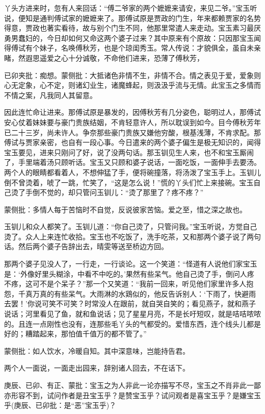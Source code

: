 \begin{parag}


    丫头方进来时，忽有人来回话：“傅二爷家的两个嬷嬷来请安，来见二爷。”宝玉听说，便知是通判傅试家的嬷嬷来了。那傅试原是贾政的门生，年来都赖贾家的名势得意，贾政也著实看待，故与别个门生不同，他那里常遣人来走动。宝玉素习最厌勇男蠢妇的，今日却如何又命这两个婆子过来？其中原来有个原故：只因那宝玉闻得傅试有个妹子，名唤傅秋芳，也是个琼闺秀玉。常人传说：才貌俱全，虽自未亲睹，然遐思遥爱之心十分诚敬，不命他们进来，恐薄了傅秋芳，\begin{note}已卯夹批：痴想。蒙侧批：大抵诸色非情不生，非情不合。情之表见于爱，爱象则心无定象，心不定，则诸幻业生，诸魔蜂起，则汲汲乎流与无情。此宝玉之多情而不情之案，凡我同人其留意。\end{note}因此连忙命让进来。那傅试原是暴发的，因傅秋芳有几分姿色，聪明过人，那傅试安心仗着妹妹要与豪门贵族结姻，不肯轻意许人，所以耽误到如今。目今傅秋芳年已二十三岁，尚未许人。争奈那些豪门贵族又嫌他穷酸，根基浅薄，不肯求配。那傅试与贾家亲密，也自有一段心事。今日遣来的两个婆子偏生是极无知识的，闻得宝玉要见，进来只刚问了好，说了没两句话。那玉钏见生人来，也不和宝玉厮闹了，手里端着汤只顾听话。宝玉又只顾和婆子说话，一面吃饭，一面伸手去要汤。两个人的眼睛都看着人，不想伸猛了手，便将碗撞落，将汤泼了宝玉手上。玉钏儿倒不曾烫着，唬了一跳，忙笑了，“这是怎么说！”慌的丫头们忙上来接碗。宝玉自己烫了手倒不觉的，却只管问玉钏儿：“烫了那里了？疼不疼？”\begin{note}蒙侧批：多情人每于苦恼时不自觉，反说彼家苦恼。爱之至，惜之深之故也。\end{note}玉钏儿和众人都笑了。玉钏儿道：“你自己烫了，只管问我。”宝玉听说，方觉自己烫了。众人上来连忙收拾。宝玉也不吃饭了，洗手吃茶，又和那两个婆子说了两句话。然后两个婆子告辞出去，晴雯等送至桥边方回。
\end{parag}


\begin{parag}


    那两个婆子见没人了，一行走，一行谈论。这一个笑道：“怪道有人说他们家宝玉是：‘外像好里头糊涂，中看不中吃的。’果然有些呆气。他自己烫了手，倒问人疼不疼，这可不是个呆子？”那一个又笑道：“我前一回来，听见他们家里许多人抱怨，千真万真的有些呆气。大雨淋的水鶏似的，他反告诉别人：‘下雨了，快避雨去罢！’你说可笑不可笑？时常没人在跟前，就自哭自笑的；看见燕子，就和燕子说话；河里看见了鱼，就和鱼说话；见了星星月亮，不是长吁短叹，就是咭咭哝哝的。且连一点刚性也没有，连那些毛丫头的气都受的。爱惜东西，连个线头儿都是好的；糟踏起来，那怕值千值万的都不管了。”\begin{note}蒙侧批：如人饮水，冷暖自知。其中深意味，岂能持告君。\end{note}两个人一面说，一面走出园来，辞别诸人回去，不在话下。\begin{note}庚辰、已卯、有正、蒙批：宝玉之为人非此一论亦描写不尽，宝玉之不肖非此一鄙亦形容不到，试问作者是丑宝玉乎？是赞宝玉乎？试问观者是喜宝玉乎？是嫌宝玉乎(庚辰、已卯批：是“恶”宝玉乎)？\end{note}
\end{parag}


